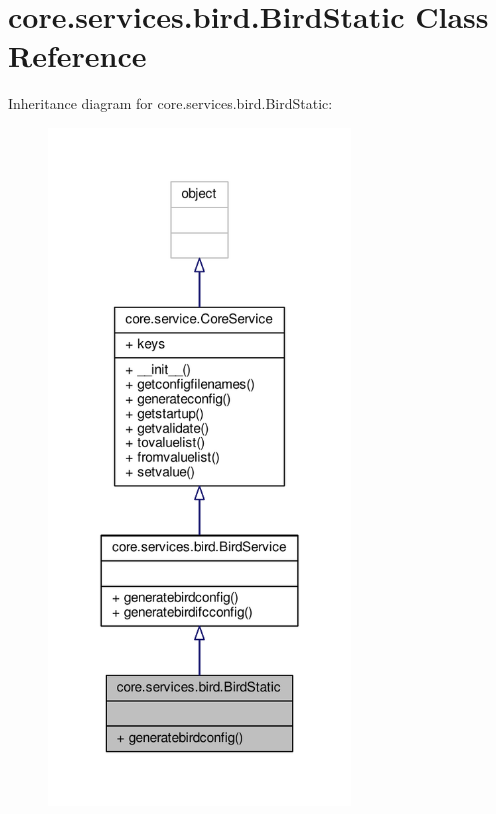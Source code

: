 \hypertarget{classcore_1_1services_1_1bird_1_1_bird_static}{\section{core.\+services.\+bird.\+Bird\+Static Class Reference}
\label{classcore_1_1services_1_1bird_1_1_bird_static}
}


Inheritance diagram for core.\+services.\+bird.\+Bird\+Static\+:
\nopagebreak
\begin{figure}[H]
\begin{center}
\leavevmode
\includegraphics[width=227pt]{classcore_1_1services_1_1bird_1_1_bird_static__inherit__graph}
\end{center}
\end{figure}



